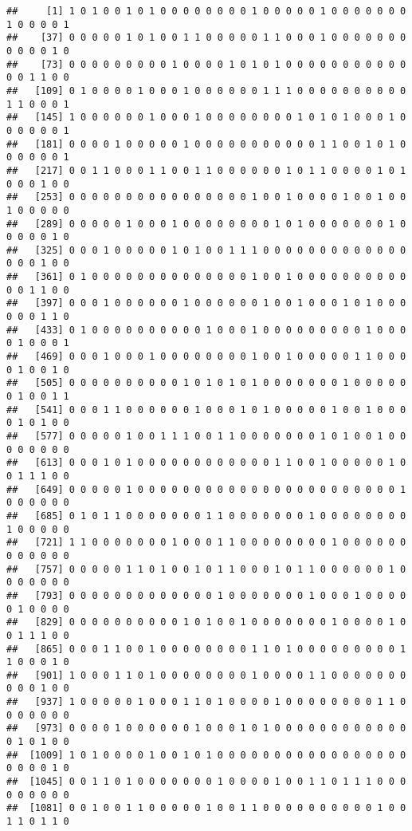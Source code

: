 \documentclass[
]{article}
\begin{document}
\begin{verbatim}
##     [1] 1 0 1 0 0 1 0 1 0 0 0 0 0 0 0 0 1 0 0 0 0 0 1 0 0 0 0 0 0 0 1 0 0 0 0 1
##    [37] 0 0 0 0 0 1 0 1 0 0 1 1 0 0 0 0 0 1 1 0 0 0 1 0 0 0 0 0 0 0 0 0 0 0 1 0
##    [73] 0 0 0 0 0 0 0 0 0 1 0 0 0 0 1 0 1 0 1 0 0 0 0 0 0 0 0 0 0 0 0 0 1 1 0 0
##   [109] 0 1 0 0 0 0 1 0 0 0 1 0 0 0 0 0 0 1 1 1 0 0 0 0 0 0 0 0 0 0 1 1 0 0 0 1
##   [145] 1 0 0 0 0 0 0 1 0 0 0 1 0 0 0 0 0 0 0 0 1 0 1 0 1 0 0 0 1 0 0 0 0 0 0 1
##   [181] 0 0 0 0 1 0 0 0 0 0 1 0 0 0 0 0 0 0 0 0 0 0 1 1 0 0 1 0 1 0 0 0 0 0 0 1
##   [217] 0 0 1 1 0 0 0 1 1 0 0 1 1 0 0 0 0 0 0 1 0 1 1 0 0 0 0 1 0 1 0 0 0 1 0 0
##   [253] 0 0 0 0 0 0 0 0 0 0 0 0 0 0 0 0 1 0 0 1 0 0 0 0 1 0 0 1 0 0 1 0 0 0 0 0
##   [289] 0 0 0 0 0 1 0 0 0 1 0 0 0 0 0 0 0 0 1 0 1 0 0 0 0 0 0 0 1 0 0 0 0 0 1 0
##   [325] 0 0 0 1 0 0 0 0 0 1 0 1 0 0 1 1 1 0 0 0 0 0 0 0 0 0 0 0 0 0 0 0 0 1 0 0
##   [361] 0 1 0 0 0 0 0 0 0 0 0 0 0 0 0 0 1 0 0 1 0 0 0 0 0 0 0 0 0 0 0 0 1 1 0 0
##   [397] 0 0 0 1 0 0 0 0 0 0 1 0 0 0 0 0 0 1 0 0 1 0 0 0 1 0 1 0 0 0 0 0 0 1 1 0
##   [433] 0 1 0 0 0 0 0 0 0 0 0 0 1 0 0 0 1 0 0 0 0 0 0 0 0 0 1 0 0 0 0 1 0 0 0 1
##   [469] 0 0 0 1 0 0 0 1 0 0 0 0 0 0 0 0 1 0 0 1 0 0 0 0 0 1 1 0 0 0 0 1 0 0 1 0
##   [505] 0 0 0 0 0 0 0 0 0 0 1 0 1 0 1 0 1 0 0 0 0 0 0 0 1 0 0 0 0 0 0 1 0 0 1 1
##   [541] 0 0 0 1 1 0 0 0 0 0 0 1 0 0 0 1 0 1 0 0 0 0 0 1 0 0 1 0 0 0 0 1 0 1 0 0
##   [577] 0 0 0 0 0 1 0 0 1 1 1 0 0 1 1 0 0 0 0 0 0 0 1 0 1 0 0 1 0 0 0 0 0 0 0 0
##   [613] 0 0 0 1 0 1 0 0 0 0 0 0 0 0 0 0 0 0 1 1 0 0 1 0 0 0 0 0 1 0 0 1 1 1 0 0
##   [649] 0 0 0 0 0 1 0 0 0 0 0 0 0 0 0 0 0 0 0 0 0 0 0 0 0 0 0 0 0 1 0 0 0 0 0 0
##   [685] 0 1 0 1 1 0 0 0 0 0 0 0 1 1 0 0 0 0 0 0 0 1 0 0 0 0 0 0 0 0 1 0 0 0 0 0
##   [721] 1 1 0 0 0 0 0 0 0 1 0 0 0 1 1 0 0 0 0 0 0 0 0 1 0 0 0 0 0 0 0 0 0 0 0 0
##   [757] 0 0 0 0 0 1 1 0 1 0 0 1 0 1 1 0 0 0 1 0 1 1 0 0 0 0 0 0 1 0 0 0 0 0 0 0
##   [793] 0 0 0 0 0 0 0 0 0 0 0 0 0 1 0 0 0 0 0 0 0 1 0 0 0 1 0 0 0 0 0 1 0 0 0 0
##   [829] 0 0 0 0 0 0 0 0 0 0 1 0 1 0 0 1 0 0 0 0 0 0 0 1 0 0 0 0 1 0 0 1 1 1 0 0
##   [865] 0 0 0 1 1 0 0 1 0 0 0 0 0 0 0 0 1 1 0 1 0 0 0 0 0 0 0 0 0 1 1 0 0 0 1 0
##   [901] 1 0 0 0 1 1 0 1 0 0 0 0 0 0 0 0 1 0 0 0 0 1 1 0 0 0 0 0 0 0 0 0 0 1 0 0
##   [937] 1 0 0 0 0 0 1 0 0 0 1 1 0 1 0 0 0 0 1 0 0 0 0 0 0 0 0 1 1 0 0 0 0 0 0 0
##   [973] 0 0 0 0 1 0 0 0 0 0 0 1 0 0 0 1 0 1 0 0 0 0 0 0 0 0 0 0 0 0 0 1 0 1 0 0
##  [1009] 1 0 1 0 0 0 0 1 0 0 1 0 1 0 0 0 0 0 0 0 0 0 0 0 0 0 0 0 0 0 0 0 0 0 1 0
##  [1045] 0 0 1 1 0 1 0 0 0 0 0 0 0 1 0 0 0 0 1 0 0 1 1 0 1 1 1 0 0 0 0 0 0 0 0 0
##  [1081] 0 0 1 0 0 1 1 0 0 0 0 0 1 0 0 1 1 0 0 0 0 0 0 0 0 0 0 1 0 0 1 1 0 1 1 0

\end{verbatim}
\end{document}
